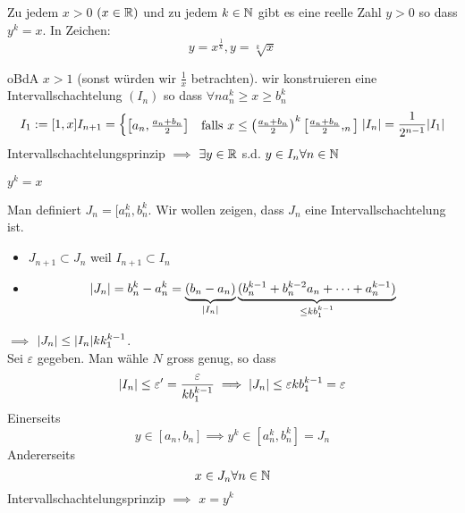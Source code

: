 \begin{Sat}
  Zu jedem $x>0$ $(x\in\mathbb{R})$ und zu jedem $k\in\mathbb{N}$ gibt es eine reelle Zahl $y>0$ so dass $y^k=x$. In Zeichen:
  \[y=x^\frac{1}{k}, y=\sqrt[k]{x}\]
\end{Sat}
\begin{Bew}
  oBdA $x>1$ (sonst würden wir $\frac{1}{x}$ betrachten). wir konstruieren eine Intervallschachtelung $(I_n)$ so dass $\forall n a_n^k \geq x \geq b_n^k$
  \begin{equation*}
    I_1:=[1,x]\\
    I_{n+1} = \begin{cases}
      \left[ a_n, \frac{a_n+b_n}{2} \right] & \text{falls } x \leq \left( \frac{a_n+b_n}{2} \right)^k
      \left[ \frac{a_n+b_n}{2}, _n \right]
    \end{cases}\\
    \mathopen| I_n \mathclose| = \frac{1}{2^{n-1}}\mathopen| I_1 \mathclose|
  \end{equation*}
  Intervallschachtelungsprinzip $\implies$ $\exists y\in\mathbb{R}$ s.d. $y\in I_n \forall n\in\mathbb{N}$ 
\end{Bew}
\begin{Sat}
  $y^k=x$
\end{Sat}
\begin{Bew}
   Man definiert $J_n=[a_n^k, b_n^k$. Wir wollen zeigen, dass $J_n$ eine Intervallschachtelung ist.
  \begin{itemize}
    \item $J_{n+1}\subset J_n$ weil $I_{n+1}\subset I_n$
    \item \[\mathopen| J_n \mathclose| = b_n^k-a_n^k = \underbrace{\left( b_n - a_n \right)}_{\mathopen| I_n \mathclose|} \underbrace{(b_n^{k-1}+b_n^{k-2}a_n + \cdots + a_n^{k-1})}_{\leq k b_1^{k-1}}\]
  \end{itemize}
  $\implies$ $\mathopen| J_n \mathclose|\leq \mathopen| I_n \mathclose|k k_1^{k-1}$.\\
  Sei $\varepsilon$ gegeben. Man wähle $N$ gross genug, so dass
  \[\mathopen| I_n \mathclose|\leq\varepsilon'=\frac{\varepsilon}{kb_1^{k-1}}\implies\mathopen| J_n \mathclose|\leq \varepsilon kb_1^{k-1}=\varepsilon\]
  Einerseits
  \[y\in\left[ a_n,b_n \right]\implies y^k\in\left[ a_n^k, b_n^k \right]=J_n\]
  Andererseits
  \[x\in J_n\forall n\in\mathbb{N}\]
  Intervallschachtelungsprinzip $\implies$ $x=y^k$
\end{Bew}
